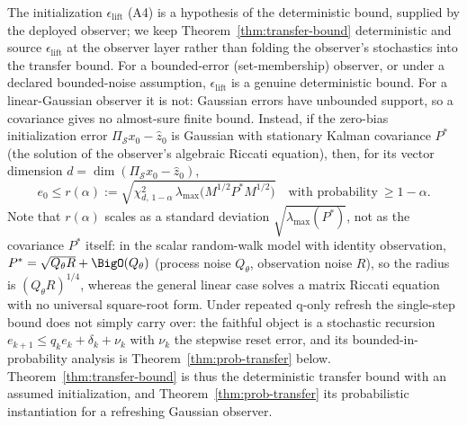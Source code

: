 \begin{remark}\label{rem:lift-source}
The initialization $\epsilon_{\mathrm{lift}}$ (A4) is a hypothesis of the deterministic bound, supplied by the deployed observer; we keep Theorem~\ref{thm:transfer-bound} deterministic and source $\epsilon_{\mathrm{lift}}$ at the observer layer rather than folding the observer's stochastics into the transfer bound. For a bounded-error (set-membership) observer, or under a declared bounded-noise assumption, $\epsilon_{\mathrm{lift}}$ is a genuine deterministic bound. For a linear-Gaussian observer it is not: Gaussian errors have unbounded support, so a covariance gives no almost-sure finite bound. Instead, if the zero-bias initialization error $\Pi_{\mathcal S}x_0-\hat z_0$ is Gaussian with stationary Kalman covariance $P^\ast$ (the solution of the observer's algebraic Riccati equation), then, for its vector dimension $d=\dim(\Pi_{\mathcal S}x_0-\hat z_0)$,
\[
  e_0\le r(\alpha):=\sqrt{\chi^2_{d,\,1-\alpha}\,\lambda_{\max}\!\bigl(M^{1/2}P^\ast M^{1/2}\bigr)}
  \quad\text{with probability}\ \ge 1-\alpha .
\]
Note that $r(\alpha)$ scales as a standard deviation $\sqrt{\lambda_{\max}(P^\ast)}$, not as the covariance $P^\ast$ itself: in the scalar random-walk model with identity observation, $P^\ast=\sqrt{Q_\theta R}+\BigO(Q_\theta)$ (process noise $Q_\theta$, observation noise $R$), so the radius is $(Q_\theta R)^{1/4}$, whereas the general linear case solves a matrix Riccati equation with no universal square-root form. Under repeated q-only refresh the single-step bound does not simply carry over: the faithful object is a stochastic recursion $e_{k+1}\le q_k e_k+\delta_k+\nu_k$ with $\nu_k$ the stepwise reset error, and its bounded-in-probability analysis is Theorem~\ref{thm:prob-transfer} below. Theorem~\ref{thm:transfer-bound} is thus the deterministic transfer bound with an assumed initialization, and Theorem~\ref{thm:prob-transfer} its probabilistic instantiation for a refreshing Gaussian observer.
\end{remark}

